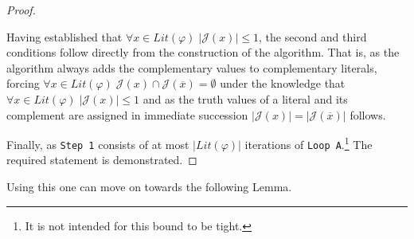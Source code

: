 \documentclass [11pt]{article}
\newcommand{\lit}{\mathit{Lit}}
\begin{document}
\begin{proof}
\begin{itemize}
\begin{itemize}
\begin{center}
\begin{tikzpicture}
\end{tikzpicture}
\end{center}
\end{itemize}
Having established that $\forall x\in \lit(\varphi) \; |\mathcal{J}(x)|\leq 1$, the second and third conditions follow directly from the construction of the algorithm. That is, as the algorithm always adds the complementary values to complementary literals, forcing  $\forall x \in \mathit{Lit}(\varphi)\;  \mathcal{J}(x) \cap \mathcal{J}(\overline{x}) = \emptyset$ under the knowledge that $\forall x\in \lit(\varphi) \; |\mathcal{J}(x)|\leq 1$ and as the truth values of a literal and its complement are assigned in immediate succession $|\mathcal{J}(x)| =| \mathcal{J}(\overline{x})|$ follows.
\end{itemize}
Finally, as \texttt{Step 1} consists of at most $|\lit(\varphi)|$ iterations of \texttt{Loop A}.\footnote{It is not intended for this bound to be tight.} The required statement is demonstrated.
\end{proof}

Using this one can move on towards the following Lemma.
\end{document}
